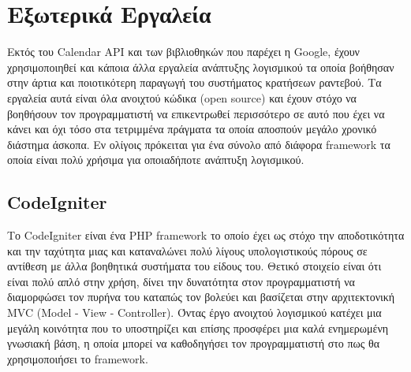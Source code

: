 
\chapter{Εξωτερικά Εργαλεία}
Εκτός του Calendar API και των βιβλιοθηκών που παρέχει η Google, έχουν χρησιμοποιηθεί και κάποια άλλα εργαλεία ανάπτυξης λογισμικού τα οποία βοήθησαν στην άρτια και ποιοτικότερη παραγωγή του συστήματος κρατήσεων ραντεβού. Τα εργαλεία αυτά είναι όλα ανοιχτού κώδικα (open source) και έχουν στόχο να βοηθήσουν τον προγραμματιστή να επικεντρωθεί περισσότερο σε αυτό που έχει να κάνει και όχι τόσο στα τετριμμένα πράγματα τα οποία αποσπούν μεγάλο χρονικό διάστημα άσκοπα. Εν ολίγοις πρόκειται για ένα σύνολο από διάφορα framework τα οποία είναι πολύ χρήσιμα για οποιαδήποτε ανάπτυξη λογισμικού.

\section{CodeIgniter}
Το CodeIgniter είναι ένα PHP framework το οποίο έχει ως στόχο την αποδοτικότητα και την ταχύτητα μιας και καταναλώνει πολύ λίγους υπολογιστικούς πόρους σε αντίθεση με άλλα βοηθητικά συστήματα του είδους του. Θετικό στοιχείο είναι ότι είναι πολύ απλό στην χρήση, δίνει την δυνατότητα στον προγραμματιστή να διαμορφώσει τον πυρήνα του καταπώς τον βολεύει και βασίζεται στην αρχιτεκτονική MVC (Model - View - Controller). Όντας έργο ανοιχτού λογισμικού κατέχει μια μεγάλη κοινότητα που το υποστηρίζει και επίσης προσφέρει μια καλά ενημερωμένη γνωσιακή βάση, η οποία μπορεί να καθοδηγήσει τον προγραμματιστή στο πως θα χρησιμοποιήσει το framework.

